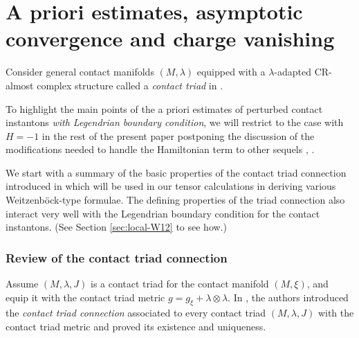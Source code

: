 \documentclass[reqno]{amsart}
\theoremstyle{theorem}
\theoremstyle{definition}
\numberwithin{equation}{section}
\begin{document}
\part{A priori estimates, asymptotic convergence and charge vanishing}
\label{part:estimates}

Consider general contact manifolds $(M,\lambda)$ equipped with a $\lambda$-adapted
CR-almost complex structure called a \emph{contact triad} in \cite{oh-wang:connection,oh-wang:CR-map1,oh-wang:CR-map2}.

To highlight the main points of the a priori estimates of perturbed contact instantons \emph{with
Legendrian boundary condition}, we will restrict to the case with $H = -1$ in the rest of the present
paper postponing the discussion of the modifications needed to handle the Hamiltonian term to
 other sequels \cite{oh:perturbed-contacton-bdy}, \cite{oh-yso:spectral}.


We start with a summary of the basic properties of the contact triad connection introduced in \cite{oh-wang:connection}
which will be used in our tensor calculations in deriving various Weitzenb\"ock-type formulae. The defining properties of
the triad connection also interact very well with the Legendrian boundary condition for the contact instantons.
(See Section \ref{sec:local-W12} to see how.)


\section{Review of the contact triad connection}
\label{subsec:connection}

Assume $(M, \lambda, J)$ is a contact triad for the contact manifold $(M, \xi)$, and equip it with
 the contact triad metric
$g=g_\xi+\lambda\otimes\lambda$.
In \cite{oh-wang:connection}, the authors introduced the \emph{contact triad connection} associated to
every contact triad $(M, \lambda, J)$ with the contact triad metric and proved its existence and uniqueness.
\end{document}
